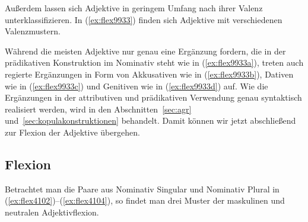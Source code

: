 Außerdem lassen sich Adjektive in geringem Umfang nach ihrer Valenz unterklassifizieren.
In (\ref{ex:flex9933}) finden sich Adjektive mit verschiedenen Valenzmustern.


\begin{exe}
  \ex \label{ex:flex9933}
  \begin{xlist}
  \end{xlist}
\end{exe}

Während die meisten Adjektive nur genau eine Ergänzung fordern, die in der prädikativen Konstruktion im Nominativ steht wie in (\ref{ex:flex9933a}), treten auch regierte Ergänzungen in Form von Akkusativen wie in (\ref{ex:flex9933b}), Dativen wie in (\ref{ex:flex9933c}) und Genitiven wie in (\ref{ex:flex9933d}) auf.
Wie die Ergänzungen in der attributiven und prädikativen Verwendung genau syntaktisch realisiert werden, wird in den Abschnitten~\ref{sec:agr} und~\ref{sec:kopulakonstruktionen} behandelt.
Damit können wir jetzt abschließend zur Flexion der Adjektive übergehen.

\subsection{Flexion}

\label{sec:adjektivflexion}


Betrachtet man die Paare aus Nominativ Singular und Nominativ Plural in (\ref{ex:flex4102})--(\ref{ex:flex4104}), so findet man drei Muster der maskulinen und neutralen Adjektivflexion.

\begin{exe}
  \ex \label{ex:flex4102}
  \begin{xlist}
  \end{xlist}
  \ex \label{ex:flex4103}
  \begin{xlist}
  \end{xlist}
  \ex \label{ex:flex4104}
  \begin{xlist}
  \end{xlist}
\end{exe}

